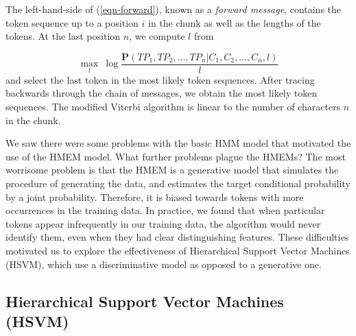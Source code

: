 The left-hand-side of (\ref{eqn-forward}), known as a {\em forward message},
contains the token sequence up to a position $i$ in the chunk as well as the 
lengths of
the tokens. 
At the last position $n$, we compute $l$ from 

\begin{equation}
\max_{l}~ \log \frac{\mathbf{P}(TP_1, TP_2, ...,
TP_n|C_1, C_2, ..., C_n,l)}{l}
\end{equation}
\noindent
and select the last token in the most likely token
sequences. After tracing backwards through the chain of messages,
we obtain the most likely token sequences. The modified Viterbi
algorithm is linear to the number of characters $n$ in the chunk.

We saw there were some problems with the basic HMM model that motivated
the use of the HMEM model.  What further problems plague the HMEMs?
The most worrisome problem is that the HMEM is a
generative model that simulates the procedure of generating the data, and
estimates the target conditional probability by a joint
probability. Therefore, it is biased towards tokens with more
occurrences in the training data.  In practice, we found that
when particular tokens appear infrequently in our training data,
the algorithm would never identify them, even when they had
clear distinguishing features. 
These difficulties motivated us to explore the effectiveness of Hierarchical
Support Vector Machines (HSVM), which use a discriminative model as 
opposed to a generative one.

\subsection{Hierarchical Support Vector Machines (HSVM)}\label{subsec:hsvm}

